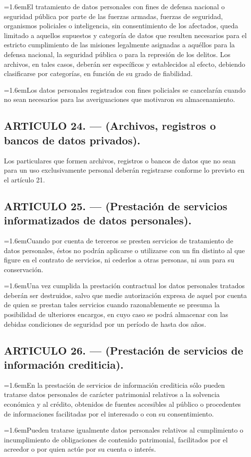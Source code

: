\documentclass[10pt,a4paper]{article}
\newcommand{\articulo}[1]{\subsection{#1}}
\newcommand{\inciso}[2]{\par{\hangindent=1.6em\hangafter=1\makebox[1.6em][l]{#1}#2\par}}
\begin{document}
\inciso{2.}{El tratamiento de datos personales con fines de defensa nacional o seguridad pública por parte de las fuerzas armadas, fuerzas de seguridad, organismos policiales o inteligencia, sin consentimiento de los afectados, queda limitado a aquellos supuestos y categoría de datos que resulten necesarios para el estricto cumplimiento de las misiones legalmente asignadas a aquéllos para la defensa nacional, la seguridad pública o para la represión de los delitos. Los archivos, en tales casos, deberán ser específicos y establecidos al efecto, debiendo clasificarse por categorías, en función de su grado de fiabilidad.}

\inciso{3.}{Los datos personales registrados con fines policiales se cancelarán cuando no sean necesarios para las averiguaciones que motivaron su almacenamiento.}

\articulo{ARTICULO 24. — (Archivos, registros o bancos de datos privados).}
Los particulares que formen archivos, registros o bancos de datos que no sean para un uso exclusivamente personal deberán registrarse conforme lo previsto en el artículo 21.

\articulo{ARTICULO 25. — (Prestación de servicios informatizados de datos personales).}
\inciso{1.}{Cuando por cuenta de terceros se presten servicios de tratamiento de datos personales, éstos no podrán aplicarse o utilizarse con un fin distinto al que figure en el contrato de servicios, ni cederlos a otras personas, ni aun para su conservación.}

\inciso{2.}{Una vez cumplida la prestación contractual los datos personales tratados deberán ser destruidos, salvo que medie autorización expresa de aquel por cuenta de quien se prestan tales servicios cuando razonablemente se presuma la posibilidad de ulteriores encargos, en cuyo caso se podrá almacenar con las debidas condiciones de seguridad por un período de hasta dos años.}

\articulo{ARTICULO 26. — (Prestación de servicios de información crediticia).}
\inciso{1.}{En la prestación de servicios de información crediticia sólo pueden tratarse datos personales de carácter patrimonial relativos a la solvencia económica y al crédito, obtenidos de fuentes accesibles al público o procedentes de informaciones facilitadas por el interesado o con su consentimiento.}

\inciso{2.}{Pueden tratarse igualmente datos personales relativos al cumplimiento o incumplimiento de obligaciones de contenido patrimonial, facilitados por el acreedor o por quien actúe por su cuenta o interés.}
\end{document}
